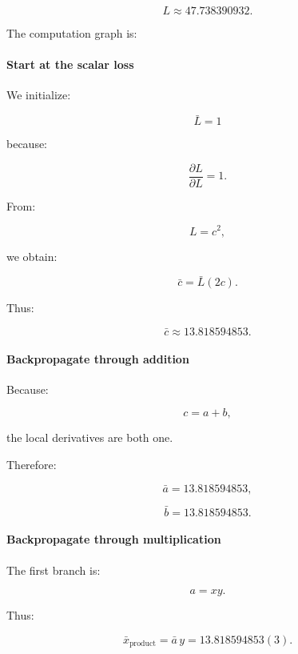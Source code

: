 \[
L\approx47.738390932.
\]

The computation graph is:

\paragraph{Start at the scalar loss}\label{02-foundations-ii-ch022-start-at-the-scalar-loss}

\hypertarget{02-foundations-ii-ch022-start-at-the-scalar-loss}{}

We initialize:

\[
\boxed{\bar L=1}
\]

because:

\[
\frac{\partial L}{\partial L}=1.
\]

From:

\[
L=c^2,
\]

we obtain:

\[
\bar c=\bar L(2c).
\]

Thus:

\[
\boxed{\bar c\approx13.818594853}.
\]

\paragraph{Backpropagate through addition}\label{02-foundations-ii-ch022-backpropagate-through-addition}

\hypertarget{02-foundations-ii-ch022-backpropagate-through-addition}{}

Because:

\[
c=a+b,
\]

the local derivatives are both one.

Therefore:

\[
\boxed{\bar a=13.818594853},
\]

\[
\boxed{\bar b=13.818594853}.
\]

\paragraph{Backpropagate through multiplication}\label{02-foundations-ii-ch022-backpropagate-through-multiplication}

\hypertarget{02-foundations-ii-ch022-backpropagate-through-multiplication}{}

The first branch is:

\[
a=xy.
\]

Thus:

\[
\bar x_{\text{product}} = \bar a\,y = 13.818594853(3).
\]

